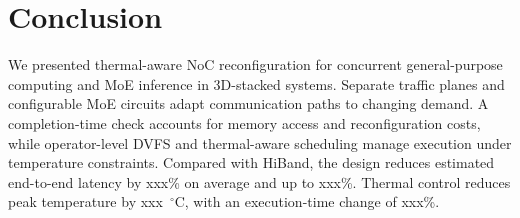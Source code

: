 \documentclass[conference,10pt]{IEEEtran}
\begin{document}
\noindent\begin{minipage}{\columnwidth}
\section{Conclusion}
\label{sec:conclusion}

We presented thermal-aware NoC reconfiguration for concurrent
general-purpose computing and MoE inference in 3D-stacked systems.
Separate traffic planes and configurable MoE circuits adapt communication
paths to changing demand. A completion-time check accounts for memory
access and reconfiguration costs, while operator-level DVFS and
thermal-aware scheduling manage execution under temperature constraints.
Compared with HiBand, the design reduces estimated end-to-end latency by
xxx\% on average and up to xxx\%. Thermal control reduces peak temperature
by xxx~$^{\circ}$C, with an execution-time change of xxx\%.

\end{minipage}

\clearpage
\balance


\end{document}
